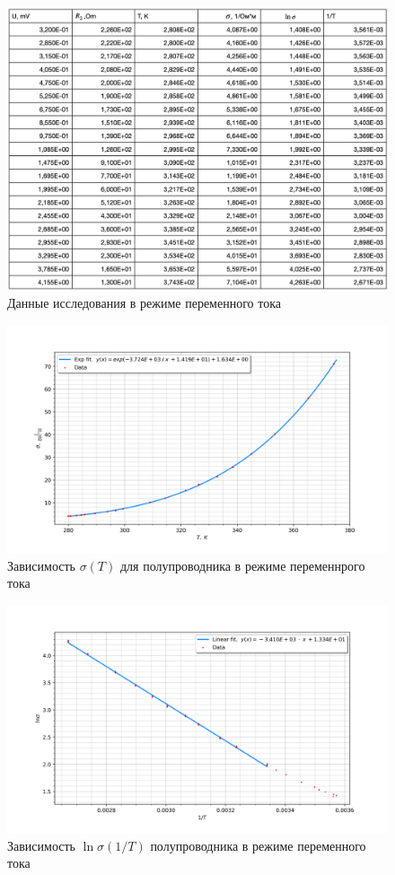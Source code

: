 \documentclass[a4paper]{article}
\begin{document}
\begin{figure}[h]
    \begin{center}
        \includegraphics[scale = 0.5]{data.png}
        \caption{Данные исследования в режиме переменного тока}
        \label{data}
    \end{center}
\end{figure}

\begin{figure}[h]
    \begin{center}
        \includegraphics[scale = 0.75]{graph2.png}
        \caption{Зависимость $\sigma(T)$ для полупроводника в режиме переменнрого тока}
        \label{gr2}
    \end{center}
\end{figure}

\begin{figure}[h]
    \begin{center}
        \includegraphics[scale = 0.75]{graph1.png}
        \caption{Зависимость $\ln{\sigma} (1/T)$ полупроводника в режиме переменного тока}
        \label{gr1}
    \end{center}
\end{figure}
\end{document}
